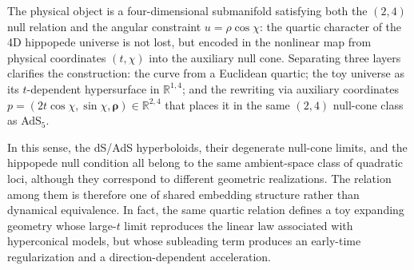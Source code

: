 \documentclass[3p,times,twocolumn]{elsarticle}
\renewcommand{\vec}[1]{\boldsymbol{#1}}
\begin{document}

The physical object is a four-dimensional submanifold satisfying both the $(2,4)$ null relation and the angular constraint $u=\rho\cos\chi$: the quartic character of the 4D hippopede universe is not lost, but encoded in the nonlinear map from physical coordinates $(t,\chi)$ into the auxiliary null cone. Separating three layers clarifies the construction: the curve from a Euclidean quartic; the toy universe as its $t$-dependent hypersurface in $\mathbb{R}^{1,4}$; and the rewriting via auxiliary coordinates $p=(2t\cos\chi,\sin\chi,\vec{\rho})\in\mathbb{R}^{2,4}$ that places it in the same $(2,4)$ null-cone class as AdS${}_5$.

In this sense, the dS/AdS hyperboloids, their degenerate null-cone limits, and the hippopede null condition all belong to the same ambient-space class of quadratic loci, although they correspond to different geometric realizations. The relation among them is therefore one of shared embedding structure rather than dynamical equivalence. In fact, the same quartic relation defines a toy expanding geometry whose large-$t$ limit reproduces the linear law associated with hyperconical models, but whose subleading term produces an early-time regularization and a direction-dependent acceleration.
\end{document}
